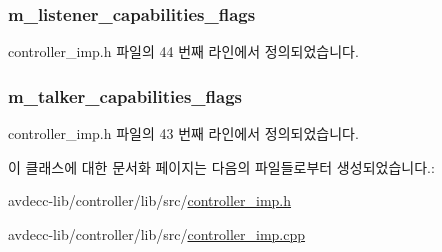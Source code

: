 \subsubsection[{\texorpdfstring{m\+\_\+listener\+\_\+capabilities\+\_\+flags}{m_listener_capabilities_flags}}]{ m\+\_\+listener\+\_\+capabilities\+\_\+flags\hspace{0.3cm}{\ttfamily [private]}}\hypertarget{classavdecc__lib_1_1controller__imp_aeec6be1aefd1fbc6a7d761abd14a5681}{}\label{classavdecc__lib_1_1controller__imp_aeec6be1aefd1fbc6a7d761abd14a5681}


controller\+\_\+imp.\+h 파일의 44 번째 라인에서 정의되었습니다.

\subsubsection[{\texorpdfstring{m\+\_\+talker\+\_\+capabilities\+\_\+flags}{m_talker_capabilities_flags}}]{ m\+\_\+talker\+\_\+capabilities\+\_\+flags\hspace{0.3cm}{\ttfamily [private]}}\hypertarget{classavdecc__lib_1_1controller__imp_a769eb75aff04273040d83e41b29b2d9f}{}\label{classavdecc__lib_1_1controller__imp_a769eb75aff04273040d83e41b29b2d9f}


controller\+\_\+imp.\+h 파일의 43 번째 라인에서 정의되었습니다.



이 클래스에 대한 문서화 페이지는 다음의 파일들로부터 생성되었습니다.\+:\begin{DoxyCompactItemize}
\item 
avdecc-\/lib/controller/lib/src/\hyperlink{controller__imp_8h}{controller\+\_\+imp.\+h}\item 
avdecc-\/lib/controller/lib/src/\hyperlink{controller__imp_8cpp}{controller\+\_\+imp.\+cpp}\end{DoxyCompactItemize}
